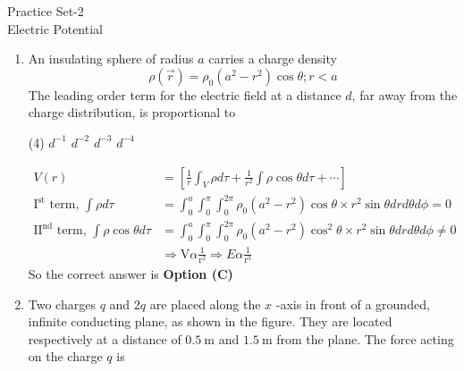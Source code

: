 \begin{abox}
	Practice Set-2\\ \vspace{0.2cm} Electric Potential
\end{abox}
\begin{enumerate}
\item An insulating sphere of radius $a$ carries a charge density
$$
\rho(\vec{r})=\rho_{0}\left(a^{2}-r^{2}\right) \cos \theta ; r<a
$$
The leading order term for the electric field at a distance $d$, far away from the charge distribution, is proportional to
{}

\begin{tasks}(4)
\task[\textbf{A.}] $d^{-1}$
\task[\textbf{B.}] $d^{-2}$
\task[\textbf{C.}] $d^{-3}$
\task[\textbf{D.}] $d^{-4}$
\end{tasks}	
\begin{answer}
	\begin{align*}
	V(r)&=\left[\frac{1}{r} \int_{V} \rho d \tau+\frac{1}{r^{2}} \int \rho \cos \theta d \tau+\cdots\right]\\
	\mathrm{I}^{\mathrm{st}}\text{ term, }\int \rho d \tau&=\int_{0}^{a} \int_{0}^{\pi} \int_{0}^{2 \pi} \rho_{0}\left(a^{2}-r^{2}\right) \cos \theta \times r^{2} \sin \theta d r d \theta d \phi=0\\
	\mathrm{II}^{\mathrm{nd}}\text{ term, }\int \rho \cos \theta d \tau&=\int_{0}^{a} \int_{0}^{\pi} \int_{0}^{2 \pi} \rho_{0}\left(a^{2}-r^{2}\right) \cos ^{2} \theta \times r^{2} \sin \theta d r d \theta d \phi \neq 0\\
	&\Rightarrow \mathrm{V} \alpha \frac{1}{\mathrm{r}^{2}} \Rightarrow E \alpha \frac{1}{\mathrm{r}^{3}}
	\end{align*}
	So the correct answer is \textbf{Option (C)}
\end{answer}
\item Two charges $q$ and $2 q$ are placed along the $x$ -axis in front of a grounded, infinite conducting plane, as shown in the figure. They are located respectively at a distance of $0.5 \mathrm{~m}$ and $1.5 \mathrm{~m}$ from the plane. The force acting on the charge $q$ is
{}


\end{enumerate}
